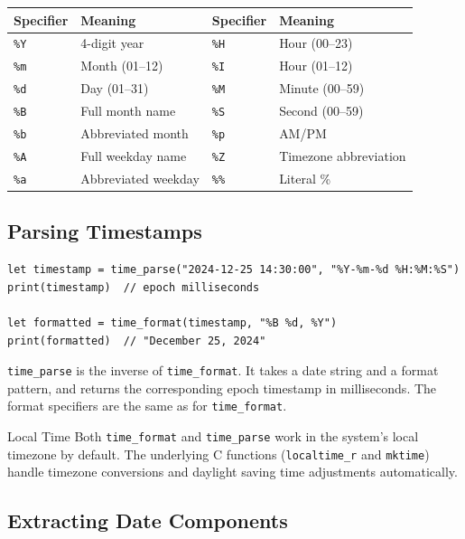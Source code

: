\begin{center}
\begin{tabular}{llll}
\toprule
\textbf{Specifier} & \textbf{Meaning} & \textbf{Specifier} & \textbf{Meaning} \\
\midrule
\texttt{\%Y} & 4-digit year & \texttt{\%H} & Hour (00--23) \\
\texttt{\%m} & Month (01--12) & \texttt{\%I} & Hour (01--12) \\
\texttt{\%d} & Day (01--31) & \texttt{\%M} & Minute (00--59) \\
\texttt{\%B} & Full month name & \texttt{\%S} & Second (00--59) \\
\texttt{\%b} & Abbreviated month & \texttt{\%p} & AM/PM \\
\texttt{\%A} & Full weekday name & \texttt{\%Z} & Timezone abbreviation \\
\texttt{\%a} & Abbreviated weekday & \texttt{\%\%} & Literal \% \\
\bottomrule
\end{tabular}
\end{center}

\subsection{Parsing Timestamps}\label{sec:time-parse}

\begin{lstlisting}[language=Lattice, caption={Parsing a date string into a timestamp}]
let timestamp = time_parse("2024-12-25 14:30:00", "%Y-%m-%d %H:%M:%S")
print(timestamp)  // epoch milliseconds

let formatted = time_format(timestamp, "%B %d, %Y")
print(formatted)  // "December 25, 2024"
\end{lstlisting}

\lstinline|time_parse| is the inverse of \lstinline|time_format|. It takes a
date string and a format pattern, and returns the corresponding epoch
timestamp in milliseconds. The format specifiers are the same as for
\lstinline|time_format|.

\begin{notebox}{Local Time}
Both \lstinline|time_format| and \lstinline|time_parse| work in the
system's local timezone by default. The underlying C functions
(\texttt{localtime\_r} and \texttt{mktime}) handle timezone conversions
and daylight saving time adjustments automatically.
\end{notebox}

\subsection{Extracting Date Components}\label{sec:time-components}

